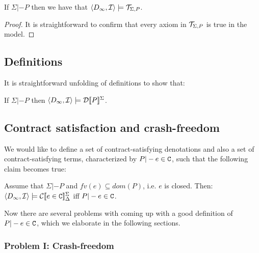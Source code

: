 \documentclass[preprint,nocopyrightspace]{sigplanconf}
\begin{document}
\begin{theorem}
If $\Sigma |- P$ then we have that $\langle D_{\infty},{\cal I}\rangle \models {\cal T}_{\Sigma,P}$. 
\end{theorem} 
\begin{proof} It is straightforward to confirm that every axiom in ${\cal T}_{\Sigma,P}$ is true in the model. \end{proof}


\subsection{Definitions}\label{sect:defs} 

It is straightforward unfolding of definitions to show that:

\begin{theorem}
If $\Sigma |- P$ then $\langle D_{\infty},{\cal I}\rangle \models {\cal D}[\![P]\!]^{\Sigma}$. 
\end{theorem}


\subsection{Contract satisfaction and crash-freedom}\label{sect:cf}
\newcommand{\Fcf}{F_{\lcfZ}} 

We would like to define a set of contract-satisfying denotations and also a set of contract-satisfying terms, 
characterized by $P |- e \in {\tt C}$, such that the following claim becomes true:

\begin{proposition} Assume that $\Sigma |- P$ and $fv(e) \subseteq dom(P)$, i.e. $e$ is closed.
Then: $\langle D_\infty,{\cal I}\rangle \models {\cal C}[\![e \in {\tt C}]\!]_{\Delta}^{\Sigma}$ iff $P |- e \in {\tt C}$.
\end{proposition}

Now there are several problems with coming up with a good definition of $P |- e \in {\tt C}$, 
which we elaborate in the following sections.

\subsubsection{Problem I: Crash-freedom} 
\end{document}
